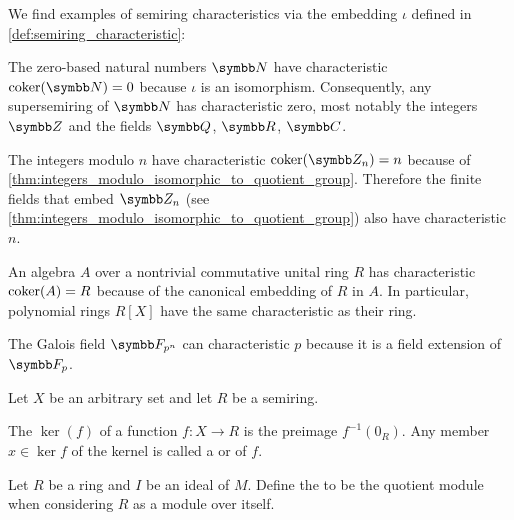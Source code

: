 \begin{example}\label{ex:semiring_characteristic}
  We find examples of semiring characteristics via the embedding \( \iota \) defined in \cref{def:semiring_characteristic}:

  \begin{exenum}
     The zero-based natural numbers \( \N \) have characteristic \( \Char(\N) = 0 \) because \( \iota \) is an isomorphism. Consequently, any supersemiring of \( \N \) has characteristic zero, most notably the integers \( \Z \) and the fields \( \Q \), \( \R \), \( \Co \).

     The integers modulo \( n \) have characteristic \( \Char(\Z_n) = n \) because of \cref{thm:integers_modulo_isomorphic_to_quotient_group}. Therefore the finite fields that embed \( \Z_n \) (see \cref{thm:integers_modulo_isomorphic_to_quotient_group}) also have characteristic \( n \).

     An algebra \( A \) over a nontrivial commutative unital ring \( R \) has characteristic \( \operatorname{coker}(A) = R \) because of the canonical embedding of \( R \) in \( A \). In particular, polynomial rings \( R[X] \) have the same characteristic as their ring.

     The Galois field \( \F_{p^n} \) can characteristic \( p \) because it is a field extension of \( \F_p \).
  \end{exenum}
\end{example}

\begin{definition}\label{def:semiring_kernel}
  Let \( X \) be an arbitrary set and let \( R \) be a semiring.

  The  \( \ker(f) \) of a function \( f: X \to R \) is the preimage \( f^{-1}(0_R) \). Any member \( x \in \ker f \) of the kernel is called a  or  of \( f \).
\end{definition}

\begin{definition}\label{def:quotient_semiring}
  Let \( R \) be a ring and \( I \) be an ideal of \( M \). Define the  to be the quotient module when considering \( R \) as a module over itself.
\end{definition}


